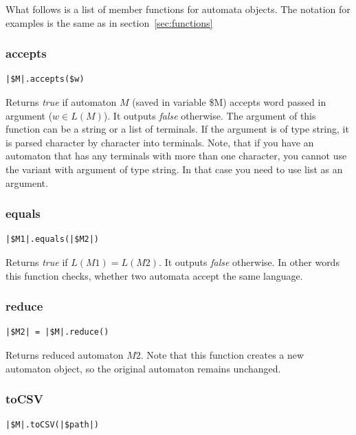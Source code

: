 \documentclass{ctuthesis}
\begin{document}
What follows is a list of member functions for automata objects. The notation for examples is the same as in section~\ref{sec:functions}

\subsubsection{accepts}
\begin{lstlisting}[language = JASL_snippet]
	|$M|.accepts($w)
\end{lstlisting}

Returns \textit{true} if automaton $M$ (saved in variable \$M) accepts word passed in argument ($w \in L(M)$). It outputs \textit{false} otherwise. The argument of this function can be a string or a list of terminals. If the argument is of type string, it is parsed character by character into terminals. Note, that if you have an automaton that has any terminals with more than one character, you cannot use the variant with argument of type string. In that case you need to use list as an argument.

\subsubsection{equals}
\begin{lstlisting}[language = JASL_snippet]
	|$M1|.equals(|$M2|)
\end{lstlisting}

Returns \textit{true} if $L(M1) = L(M2)$. It outputs \textit{false} otherwise. In other words this function checks, whether two automata accept the same language. 

\subsubsection{reduce}
\begin{lstlisting}[language = JASL_snippet]
	|$M2| = |$M|.reduce()
\end{lstlisting}

Returns reduced automaton $M2$. Note that this function creates a new automaton object, so the original automaton remains unchanged.

\subsubsection{toCSV}
\begin{lstlisting}[language = JASL_snippet]
	|$M|.toCSV(|$path|)
\end{lstlisting}
\end{document}
